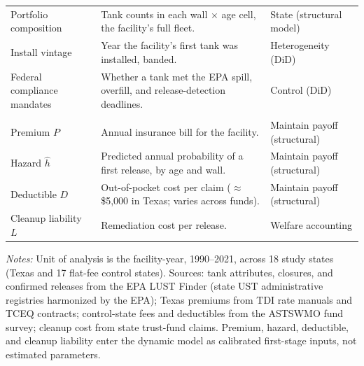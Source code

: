 \begin{threeparttable}
\begin{tabular}{@{}p{2.9cm}p{7.4cm}p{3.7cm}@{}}
Portfolio composition & Tank counts in each wall $\times$ age cell, the facility's full fleet. & State (structural model) \\
Install vintage & Year the facility's first tank was installed, banded. & Heterogeneity (DiD) \\
Federal compliance mandates & Whether a tank met the EPA spill, overfill, and release-detection deadlines. & Control (DiD) \\
\addlinespace\multicolumn{3}{@{}l}{\textit{Priced and calibrated inputs}}\\[1pt]
Premium $P$ & Annual insurance bill for the facility. & Maintain payoff (structural) \\
Hazard $\hat{h}$ & Predicted annual probability of a first release, by age and wall. & Maintain payoff (structural) \\
Deductible $D$ & Out-of-pocket cost per claim ($\approx$\$5{,}000 in Texas; varies across funds). & Maintain payoff (structural) \\
Cleanup liability $L$ & Remediation cost per release. & Welfare accounting \\
\bottomrule
\end{tabular}
\begin{tablenotes}[flushleft]
\small
\item \textit{Notes:} Unit of analysis is the facility-year, 1990--2021, across 18 study states (Texas and 17 flat-fee control states). Sources: tank attributes, closures, and confirmed releases from the EPA LUST Finder (state UST administrative registries harmonized by the EPA); Texas premiums from TDI rate manuals and TCEQ contracts; control-state fees and deductibles from the ASTSWMO fund survey; cleanup cost from state trust-fund claims. Premium, hazard, deductible, and cleanup liability enter the dynamic model as calibrated first-stage inputs, not estimated parameters.
\end{tablenotes}
\end{threeparttable}

